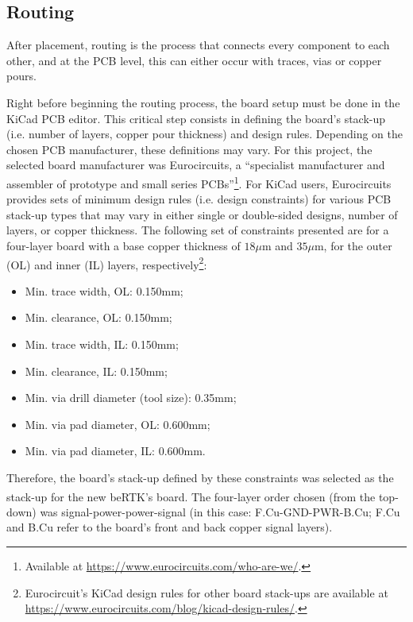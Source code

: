 \subsection{Routing}\label{sec:52_Routing}

After placement, routing is the process that connects every component to each other, and at the PCB level, this can either occur with traces, vias or copper pours.

Right before beginning the routing process, the board setup must be done in the KiCad PCB editor. This critical step consists in defining the board's stack-up (i.e. number of layers, copper pour thickness) and design rules. Depending on the chosen PCB manufacturer, these definitions may vary. For this project, the selected board manufacturer was Eurocircuits, a ``specialist manufacturer and assembler of prototype and small series PCBs''\footnote[19]{Available at \url{https://www.eurocircuits.com/who-are-we/}.}. For KiCad users, Eurocircuits provides sets of minimum design rules (i.e. design constraints) for various PCB stack-up types that may vary in either single or double-sided designs, number of layers, or copper thickness. The following set of constraints presented are for a four-layer board with a base copper thickness of $18 \mu$m and $35 \mu$m, for the outer (OL) and inner (IL) layers, respectively\footnote[20]{Eurocircuit's KiCad design rules for other board stack-ups are available at \url{https://www.eurocircuits.com/blog/kicad-design-rules/}.}:
\begin{itemize}
	\item Min. trace width, OL: 0.150mm;
	
	\item Min. clearance, OL: 0.150mm;
	
	\item Min. trace width, IL: 0.150mm;
	
	\item Min. clearance, IL: 0.150mm;

	\item Min. via drill diameter (tool size): 0.35mm;
	
	\item Min. via pad diameter, OL: 0.600mm;
	
	\item Min. via pad diameter, IL: 0.600mm.
\end{itemize}
Therefore, the board's stack-up defined by these constraints was selected as the stack-up for the new beRTK\textsuperscript{\textregistered}'s board. The four-layer order chosen (from the top-down) was signal-power-power-signal (in this case: F.Cu-GND-PWR-B.Cu; F.Cu and B.Cu refer to the board's front and back copper signal layers).

